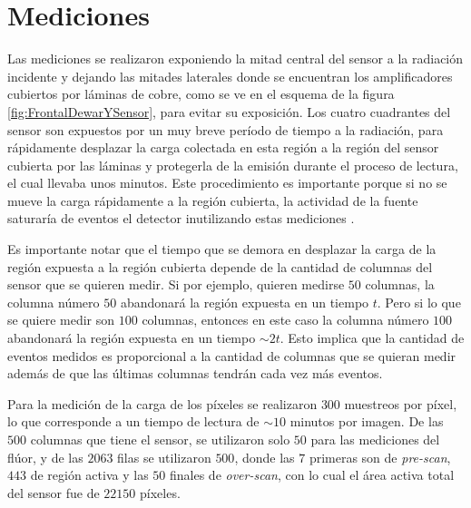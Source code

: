 \section{Mediciones}
\noindent Las mediciones se realizaron exponiendo la mitad central del sensor a la radiación incidente y dejando las mitades laterales donde se encuentran los amplificadores cubiertos por láminas de cobre, como se ve en el esquema de la figura \ref{fig:FrontalDewarYSensor}, para evitar su exposición. Los cuatro cuadrantes del sensor son expuestos por un muy breve período de tiempo a la radiación, para rápidamente desplazar la carga colectada en esta región a la región del sensor cubierta por las láminas y protegerla de la emisión durante el proceso de lectura, el cual llevaba unos minutos. Este procedimiento es importante porque si no se mueve la carga rápidamente a la región cubierta, la actividad de la fuente saturaría de eventos el detector inutilizando estas mediciones .

Es importante notar que el tiempo que se demora en desplazar la carga de la región expuesta a la región cubierta depende de la cantidad de columnas del sensor que se quieren medir. Si por ejemplo, quieren medirse $50$ columnas, la columna número $50$ abandonará la región expuesta en un tiempo $t$. Pero si lo que se quiere medir son $100$ columnas, entonces en este caso la columna número $100$ abandonará la región expuesta en un tiempo $\sim 2t$. Esto implica que la cantidad de eventos medidos es proporcional a la cantidad de columnas que se quieran medir además de que las últimas columnas tendrán cada vez más eventos.

Para la medición de la carga de los píxeles se realizaron $300$ muestreos por píxel, lo que corresponde a un tiempo de lectura de $\sim 10$ minutos por imagen. De las $500$ columnas que tiene el sensor, se utilizaron solo $50$ para las mediciones del flúor, y de las $2063$ filas se utilizaron $500$, donde las $7$ primeras son de \textit{pre-scan}, $443$ de región activa y las $50$ finales de \textit{over-scan}, con lo cual el área activa total del sensor fue de $22150$ píxeles.

